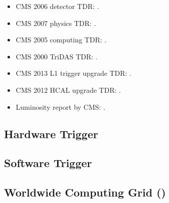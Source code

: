     \begin{itemize}
        \item CMS 2006 detector TDR: \cite{Bayatian:922757}.
        \item CMS 2007 physics TDR: \cite{Bayatian:942733}.
        \item CMS 2005 computing TDR: \cite{Bayatyan:838359}.
        \item CMS 2000 TriDAS TDR: \cite{Bayatyan:706847}.
        \item CMS 2013 L1 trigger upgrade TDR: \cite{Tapper:1556311}.
        \item CMS 2012 HCAL upgrade TDR: \cite{Mans:1481837}.
        \item Luminosity report by CMS: \cite{CMS-PAS-LUM-17-001}.
    \end{itemize}

\subsection{Hardware Trigger}

\subsection{Software Trigger}

\subsection{Worldwide \LHC Computing Grid (\WLCG)}

